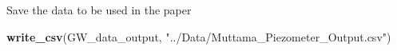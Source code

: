 \documentclass[
]{article}
\newenvironment{Shaded}{\begin{snugshade}}{\end{snugshade}}
\newcommand{\FunctionTok}[1]{\textcolor[rgb]{0.13,0.29,0.53}{\textbf{#1}}}
\newcommand{\NormalTok}[1]{#1}
\newcommand{\StringTok}[1]{\textcolor[rgb]{0.31,0.60,0.02}{#1}}
\begin{document}
Save the data to be used in the paper

\begin{Shaded}
\begin{Highlighting}[]
\FunctionTok{write\_csv}\NormalTok{(GW\_data\_output, }\StringTok{"../Data/Muttama\_Piezometer\_Output.csv"}\NormalTok{)}
\end{Highlighting}
\end{Shaded}
\end{document}
